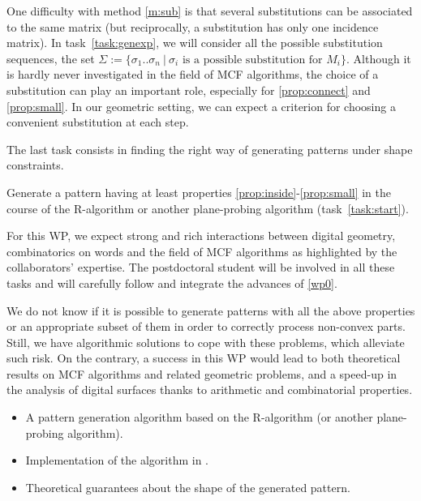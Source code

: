 One difficulty with method \ref{m:sub} is that several substitutions can be associated to the
same matrix (but reciprocally, a substitution has only one incidence matrix).
In task~\ref{task:genexp}, we will consider all the possible substitution sequences, \ie the set
$\Sigma := \{ \sigma_1..\sigma_n \ | \ \sigma_i \text{ is a possible substitution for } M_i \}$.
Although it is hardly never investigated in the field of MCF algorithms, the choice of a
substitution can play an important role, especially for \ref{prop:connect} and \ref{prop:small}.
In our geometric setting, we can expect a criterion for choosing a convenient substitution at each step. 

The last task consists in finding the right way of generating patterns under shape constraints. 
%
\begin{Task}
  \label{task:genpat}
  Generate a pattern having at least properties \ref{prop:inside}-\ref{prop:small} in the course of
  the R-algorithm or another plane-probing algorithm (task~\ref{task:start}). 
\end{Task}

For this WP, we expect strong and rich interactions between digital geometry, combinatorics on words
and the field of MCF algorithms as highlighted by the collaborators' expertise. The postdoctoral
student will be involved in all these tasks and will carefully follow and integrate the advances
of \ref{wp0}.


\Risks
We do not know if it is possible to generate patterns with all the above properties
or an appropriate subset of them in order to correctly process non-convex parts.
Still, we have algorithmic solutions
\cite{LPRJMIV2017} to cope with these problems, which alleviate such risk. 
On the contrary, a success in this WP would lead to both theoretical results
on MCF algorithms and related geometric problems, and a speed-up in the analysis
of digital surfaces thanks to arithmetic and combinatorial properties.  

\Success
\begin{itemize}
  \item A pattern generation algorithm based on the R-algorithm (or another plane-probing algorithm).
  \item Implementation of the algorithm in \DGtal.
  \item Theoretical guarantees about the shape of the generated pattern. 
\end{itemize}

